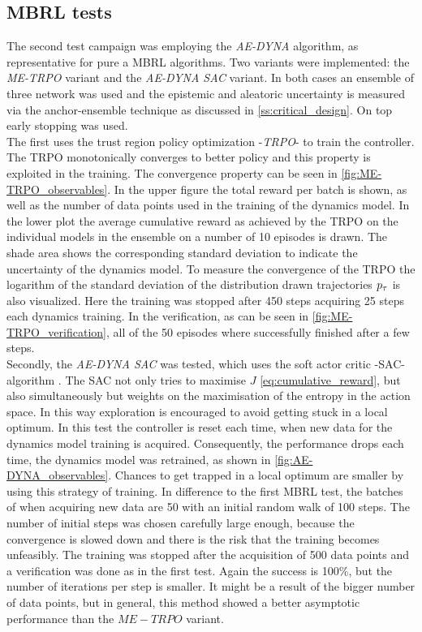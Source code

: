\documentclass[
 reprint,
 amsmath,amssymb,amsfonts,clevref,
 aps,
prstab,
]{revtex4-2}
\begin{document}
\subsection{MBRL tests}
The second test campaign was employing the \emph{AE-DYNA} algorithm, as representative for pure a MBRL algorithms. Two variants were implemented: the \emph{ME-TRPO} variant and the \emph{AE-DYNA SAC} variant. In both cases an ensemble of three network was used and the epistemic and aleatoric uncertainty is measured via the anchor-ensemble technique as discussed in \cref{ss:critical_design}. On top early stopping was used.
\\ The first uses the trust region policy optimization -\emph{TRPO}- \cite{Schulman2015} to train the controller. The TRPO monotonically converges to better policy and this property is exploited in the training. The convergence property can be seen in \cref{fig:ME-TRPO_observables}. In the upper figure the total reward per batch is shown, as well as the number of data points used in the training of the dynamics model. In the lower plot the average cumulative reward as achieved by the TRPO on the individual models in the ensemble on a number of 10 episodes is drawn. The shade area shows the corresponding standard deviation to indicate the uncertainty of the dynamics model. To measure the convergence of the TRPO the logarithm of the standard deviation of the distribution drawn trajectories $p_\tau$ is also visualized. Here the training was stopped after 450 steps acquiring 25 steps each dynamics training. In the verification, as can be seen in \cref{fig:ME-TRPO_verification}, all of the 50 episodes where successfully finished after a few steps. \\
Secondly, the \emph{AE-DYNA SAC} was tested, which uses the soft actor critic -SAC- algorithm \cite{Haarnoja2018a}. The SAC not only tries to maximise $J$ \cref{eq:cumulative_reward}, but also simultaneously but weights on the maximisation of the entropy in the action space. In this way exploration is encouraged to avoid getting stuck in a local optimum. In this test the controller is reset each time, when new data for the dynamics model training is acquired. Consequently, the performance drops each time, the dynamics model was retrained, as shown in \cref{fig:AE-DYNA_observables}. Chances to get trapped in a local optimum are smaller by using this strategy of training.
In difference to the first MBRL test, the batches of when acquiring new data are 50 with an initial random walk of 100 steps. The number of initial steps was chosen carefully large enough, because the convergence is slowed down and there is the risk that the training becomes unfeasibly. The training was stopped after the acquisition of 500 data points and a verification was done as in the first test. Again the success is 100\%, but the number of iterations per step is smaller. It might be a result of the bigger number of data points, but in general, this method showed a better asymptotic performance than the $ME-TRPO$ variant.
\end{document}
